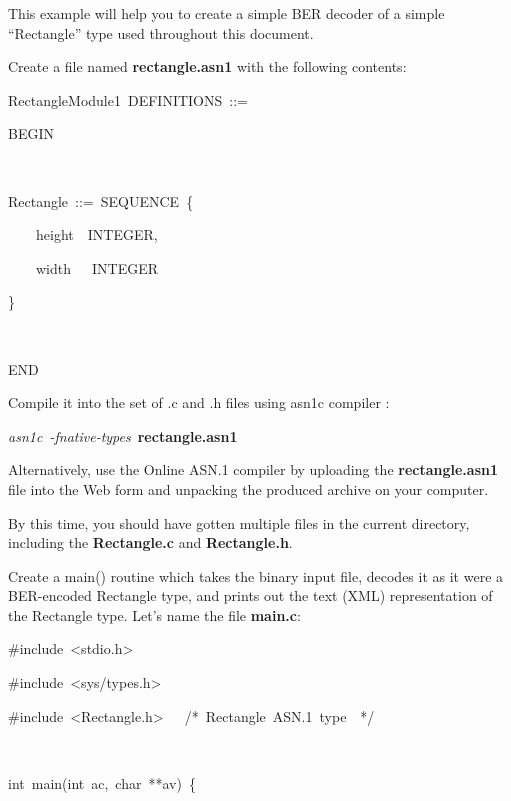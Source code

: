 \documentclass[english,oneside,12pt]{book}
\newenvironment{lyxcode}
{\par\begin{list}{}{
\setlength{\rightmargin}{\leftmargin}
\setlength{\listparindent}{0pt}%
\raggedright
\setlength{\itemsep}{0pt}
\setlength{\parsep}{0pt}
\normalfont\ttfamily}%
 \item[]}
{\end{list}}
\begin{document}
This example will help you to create a simple BER decoder of a simple
``Rectangle'' type used throughout this document.
\begin{enumerate}
\item Create a file named \textbf{rectangle.asn1} with the following contents:

\begin{lyxcode}
RectangleModule1~DEFINITIONS~::=

BEGIN

~

Rectangle~::=~SEQUENCE~\{

~~~~height~~INTEGER,

~~~~width~~~INTEGER

\}

~

END
\end{lyxcode}
\item Compile it into the set of .c and .h files using asn1c compiler \cite{ASN1C}:

\begin{lyxcode}
\emph{asn1c~-fnative-types}~\textbf{rectangle.asn1}
\end{lyxcode}
\item Alternatively, use the Online ASN.1 compiler \cite{AONL} by uploading
the \textbf{rectangle.asn1} file into the Web form and unpacking the
produced archive on your computer.
\item By this time, you should have gotten multiple files in the current
directory, including the \textbf{Rectangle.c} and \textbf{Rectangle.h}.
\item Create a main() routine which takes the binary input file, decodes
it as it were a BER-encoded Rectangle type, and prints out the text
(XML) representation of the Rectangle type. Let's name the file \textbf{main.c}:\clearpage{}

\begin{lyxcode}
{\small \#include~<stdio.h>}{\small \par}

{\small \#include~<sys/types.h>}{\small \par}

{\small \#include~<Rectangle.h>~~~/{*}~Rectangle~ASN.1~type~~{*}/}{\small \par}

{\small{}~}{\small \par}

{\small int~main(int~ac,~char~{*}{*}av)~\{}{\small \par}


\end{lyxcode}
\end{enumerate}
\end{document}
